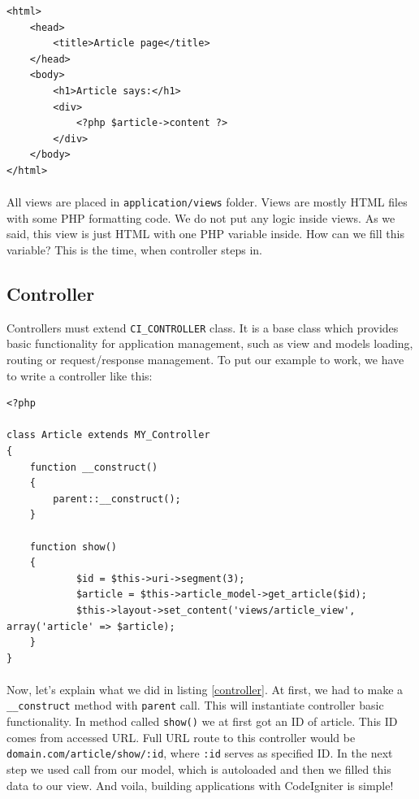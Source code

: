 \begin{lstlisting}[label={view}, caption={Article view}]
<html>
	<head>
		<title>Article page</title>
	</head>
	<body>
		<h1>Article says:</h1>
		<div>
			<?php $article->content ?>
		</div>
	</body>
</html>
\end{lstlisting}

\paragraph{}
All views are placed in \texttt{application/views} folder. Views are mostly HTML files with some PHP formatting code. We do not put any logic inside views. As we said, this view is just HTML with one PHP variable inside. How can we fill this variable? This is the time, when controller steps in.

\subsection{Controller}
Controllers must extend \texttt{CI\_CONTROLLER} class. It is a base class which provides basic functionality for application management, such as view and models loading, routing or request/response management. To put our example to work, we have to write a controller like this:

\begin{lstlisting}[label={controller}, caption={Article controller}]
<?php

class Article extends MY_Controller
{
    function __construct()
    {
        parent::__construct();
    }

    function show()
    {
    		$id = $this->uri->segment(3);
    		$article = $this->article_model->get_article($id);
    		$this->layout->set_content('views/article_view', array('article' => $article);
    }
}
\end{lstlisting}

\paragraph{}
Now, let's explain what we did in listing \ref{controller}. At first, we had to make a \texttt{\_\_construct} method with \texttt{parent} call. This will instantiate controller basic functionality. In method called \texttt{show()} we at first got an ID of article. This ID comes from accessed URL. Full URL route to this controller would be \texttt{domain.com/article/show/:id}, where \texttt{:id} serves as specified ID. In the next step we used call from our model, which is autoloaded and then we filled this data to our view. And voila, building applications with CodeIgniter is simple!

